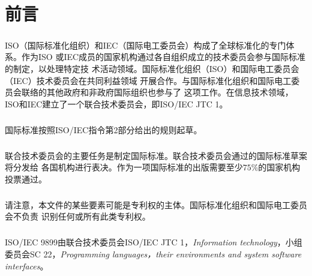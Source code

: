 \chapter*{前言}

\paragraph{}
ISO（国际标准化组织）和IEC（国际电工委员会）构成了全球标准化的专门体系。作为ISO
或IEC成员的国家机构通过各自组织成立的技术委员会参与国际标准的制定，以处理特定技
术活动领域。国际标准化组织（ISO）和国际电工委员会（IEC）技术委员会在共同利益领域
开展合作。与国际标准化组织和国际电工委员会联络的其他政府和非政府国际组织也参与了
这项工作。在信息技术领域，ISO和IEC建立了一个联合技术委员会，即ISO/IEC JTC 1。

\paragraph{}
国际标准按照ISO/IEC指令第2部分给出的规则起草。

\paragraph{}
联合技术委员会的主要任务是制定国际标准。联合技术委员会通过的国际标准草案将分发给
各国机构进行表决。作为一项国际标准的出版需要至少$75\%$的国家机构投票通过。

\paragraph{}
请注意，本文件的某些要素可能是专利权的主体。国际标准化组织和国际电工委员会不负责
识别任何或所有此类专利权。

\paragraph{}
ISO/IEC 9899由联合技术委员会ISO/IEC JTC 1，\textit{Information technology}，小组
委员会SC 22，\textit{Programming languages，their environments and system
software interfaces}。

